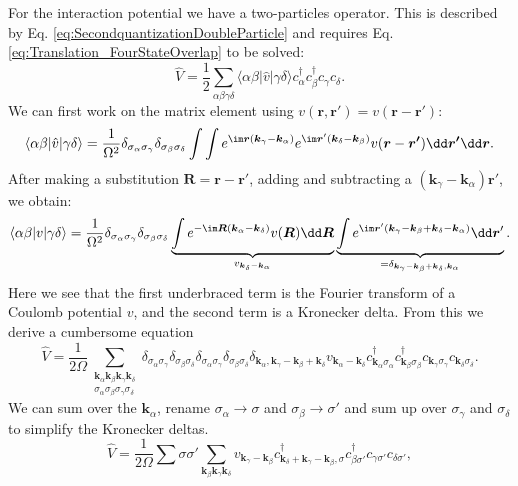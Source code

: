 \documentclass[../main.tex]{subfile}
\begin{document}
For the interaction potential we have a two-particles operator. This is described by Eq. \ref{eq:SecondquantizationDoubleParticle} and
requires Eq. \ref{eq:Translation_FourStateOverlap} to be solved:
\[
    \hat{V} = \frac{1}{2} \sum_{\alpha \beta \gamma \delta} \langle \alpha \beta |\hat{v}|\gamma\delta\rangle 
    c_{\alpha}^{\dagger}c_{\beta}^{\dagger}c_{\gamma}c_{\delta}.
\]
We can first work on the matrix element using $v(\bm{r}, \bm{r'})= v(\bm{r} - \bm{r'})$:
\[
    \langle \alpha \beta |\hat{v}|\gamma\delta\rangle = \frac{1}{\Omega^2} \delta_{\sigma_{\alpha}\sigma_{\gamma}}\delta_{\sigma_{\beta}\sigma_{\delta}} \int \int  e^{\im \bm{r}(\bm{k}_{\gamma}-\bm{k}_{\alpha})}  e^{\im \bm{r}'(\bm{k}_{\delta}-\bm{k}_{\beta})} v(\bm{r} - \bm{r'}) \dd \bm{r'} \dd \bm{r}.
\]
After making a substitution $\bm{R} = \bm{r} - \bm{r}'$, adding and subtracting a $(\bm{k}_{\gamma}-\bm{k}_{\alpha})\bm{r}'$, we obtain:
\[
    \langle \alpha \beta |v|\gamma\delta\rangle = \frac{1}{\Omega^2} \delta_{\sigma_{\alpha}\sigma_{\gamma}}\delta_{\sigma_{\beta}\sigma_{\delta}}
     \underbrace{\int e^{-\im\bm{R}(\bm{k}_{\alpha}- \bm{k}_{\delta})} v(\bm{R}) \dd \bm{R}}_{v_{\bm{k}_{\delta}- \bm{k}_{\alpha}}}
    \underbrace{\int e^{\im\bm{r}'\left(\bm{k}_{\gamma}-\bm{k}_{\beta} + \bm{k}_{\delta} -\bm{k}_{\alpha}\right)}\dd \bm{r}'}_{= \delta_{\bm{k}_{\gamma}-\bm{k}_{\beta} + \bm{k}_{\delta} , \bm{k}_{\alpha}}}.
\]
Here we see that the first underbraced term is the Fourier transform of a Coulomb potential $v$, and the second term is a Kronecker delta.
From this we derive a cumbersome equation
\[
    \hat{V} = \frac{1}{2\Omega} \sum_{\substack{\bm{k}_{\alpha}\bm{k}_{\beta}\bm{k}_{\gamma}\bm{k}_{\delta} \\
         \sigma_{\alpha}\sigma_{\beta}\sigma_{\gamma}\sigma_{\delta}}}
    \delta_{\sigma_{\alpha}\sigma_{\gamma}}\delta_{\sigma_{\beta}\sigma_{\delta}}
    \delta_{\sigma_{\alpha}\sigma_{\gamma}}\delta_{\sigma_{\beta}\sigma_{\delta}}
    \delta_{ \bm{k}_{\alpha}, \bm{k}_{\gamma}-\bm{k}_{\beta} + \bm{k}_{\delta}}
    v_{\bm{k}_{\alpha}- \bm{k}_{\delta}} c_{\bm{k}_\alpha\sigma_{\alpha}}^{\dagger}c_{\bm{k}_\beta\sigma_{\beta}}^{\dagger}c_{\bm{k}_\gamma\sigma_{\gamma}}c_{\bm{k}_\delta\sigma_{\delta}}.
\]
We can sum over the $\bm{k}_{\alpha}$, rename $\sigma_{\alpha} \rightarrow\sigma$ and $\sigma_{\beta} \rightarrow\sigma'$
 and sum up over $\sigma_{\gamma}$ and $\sigma_{\delta}$ to simplify the Kronecker deltas.
\[
    \hat{V} = \frac{1}{2\Omega} \sum{\sigma\sigma'} \sum_{\bm{k}_{\beta}\bm{k}_{\gamma}\bm{k}_{\delta}} v_{\bm{k}_{\gamma}- \bm{k}_{\beta}} c^{\dagger}_{\bm{k}_{\delta}+ \bm{k}_{\gamma}-\bm{k}_{\beta},\sigma}
        c^{\dagger}_{\beta\sigma'} c_{\gamma\sigma'} c_{\delta\sigma'} ,
\] 
\end{document}
